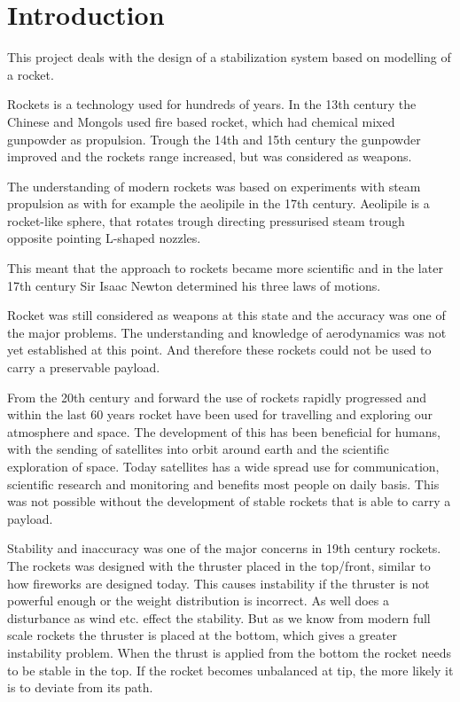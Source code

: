 \chapter{Introduction}
This project deals with the design of a stabilization system based on modelling of a rocket.

Rockets is a technology used for hundreds of years. In the 13th century the Chinese and Mongols used fire based rocket, which had chemical mixed gunpowder as propulsion. Trough the 14th and 15th century the gunpowder improved and the rockets range increased, but was considered as weapons.  

The understanding of modern rockets was based on experiments with steam propulsion as with for example the aeolipile in the 17th century. Aeolipile is a rocket-like sphere, that rotates trough directing pressurised steam trough opposite pointing L-shaped nozzles. 

This meant that the approach to rockets became more scientific and in the later 17th century Sir Isaac Newton determined his three laws of motions.

Rocket was still considered as weapons at this state and the accuracy was one of the major problems. The understanding and knowledge of aerodynamics was not yet established at this point. And therefore these rockets could not be used to carry a preservable payload. 


From the 20th century and forward the use of rockets rapidly progressed and within the last 60 years rocket have been used for travelling and exploring our atmosphere and space. The development of this has been beneficial for humans, with the sending of satellites into orbit around earth and the scientific exploration of space. Today satellites has a wide spread use for communication, scientific research and monitoring and benefits most people on daily basis. This was not possible without the development of stable rockets that is able to carry a payload.   

Stability and inaccuracy was one of the major concerns in 19th century rockets. The rockets was designed with the thruster placed in the top/front, similar to how fireworks are designed today. This causes instability if the thruster is not powerful enough or the weight distribution is incorrect. As well does a disturbance as wind etc. effect the stability. But as we know from modern full scale rockets the thruster is placed at the bottom, which gives a greater instability problem. When the thrust is applied from the bottom the rocket needs to be stable in the top. If the rocket becomes unbalanced at tip, the more likely it is to deviate from its path.  



